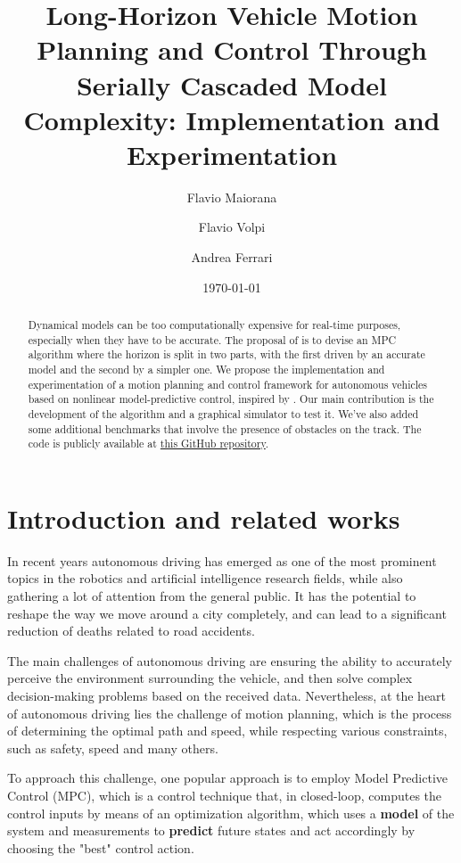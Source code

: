 \documentclass[a4paper, onecolumn, 12pt]{article}
\title{Long-Horizon Vehicle Motion Planning and Control Through Serially Cascaded Model Complexity: Implementation and Experimentation}
\author{Flavio Maiorana \and Flavio Volpi \and Andrea Ferrari}
\date{\today}
\begin{document}
\listoftodos

\maketitle
\begin{abstract}
    Dynamical models can be too computationally expensive for real-time
    purposes, especially when they have to be accurate. The proposal of
    \cite{paper} is to devise an MPC algorithm where the horizon is split in two
    parts, with the first driven by an accurate model and the second by a
    simpler one. We propose the implementation and experimentation of a motion
    planning and control framework for autonomous vehicles based on nonlinear
    model-predictive control, inspired by \cite{paper}. Our main contribution is
    the development of the algorithm and a graphical simulator to test it. We've
    also added some additional benchmarks that involve the presence of obstacles
    on the track. The code is publicly available at
    \href{https://github.com/neverorfrog/vehicle-control}{this GitHub
    repository}.
\end{abstract}

\newpage
\tableofcontents

\newpage
\section{Introduction and related works}

In recent years autonomous driving has emerged as one of the most prominent topics in the robotics and artificial intelligence research fields, while also gathering a lot of attention from the general public. It has the potential to reshape the way we move around a city completely, and can lead to a significant reduction of deaths related to road accidents.

The main challenges of autonomous driving are ensuring the ability to accurately perceive the environment surrounding the vehicle, and then solve complex decision-making problems based on the received data. Nevertheless,  at the heart of autonomous driving lies the challenge of motion planning, which is the process of determining the optimal path and speed, while respecting various constraints, such as safety, speed and many others.

To approach this challenge, one popular approach is to employ Model Predictive Control (MPC), which is a control technique that, in closed-loop, computes the control inputs by means of an optimization algorithm,
which uses a \textbf{model} of the system and measurements to \textbf{predict}
future states and act accordingly by choosing the "best" control action. 
\end{document}
